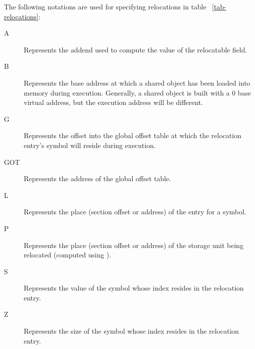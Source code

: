 The following notations are used for specifying relocations in table~
\ref{tab-relocations}:
\begin{description}
\item[A] Represents the addend used to compute the value of the
  relocatable field.
\item[B] Represents the base address at which a shared object has been
  loaded into memory during execution.  Generally, a shared object is
  built with a 0 base virtual address, but the execution address will
  be different.
\item[G] Represents the offset into the global offset table at which 
  the relocation entry's symbol will reside during execution.
\item[GOT] Represents the address of the global offset table.
\item[L] Represents the place (section offset or address) of the
   entry for a symbol.
\item[P] Represents the place (section offset or address) of the
  storage unit being relocated (computed using ).
\item[S] Represents the value of the symbol whose index resides in the
  relocation entry.
\item[Z] Represents the size of the symbol whose index resides in the
  relocation entry.
\end{description}

